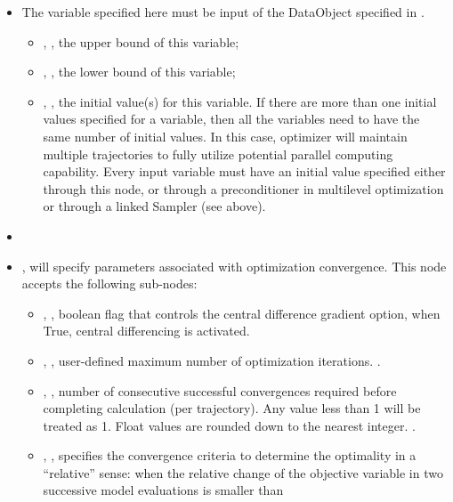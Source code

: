 \begin{itemize}
\item \variableDescription
 The variable specified here must be input of the DataObject specified in .
 \variableChildrenIntro
 \begin{itemize}
    \item {}, , the upper bound of this variable;
    \item {}, , the lower bound of this variable;
    \item {}, , the initial value(s) for this variable. If there are more
    than one initial values specified for a variable, then all the variables need to have the same number of initial values. In this case,
     optimizer will maintain multiple trajectories to fully utilize potential parallel computing capability.
    Every input variable must have an initial value specified either through this node, or through a
    preconditioner in multilevel optimization or through a linked Sampler (see above).
  \end{itemize}
\item \constantVariablesDescription
\item {},  will specify parameters associated with optimization
convergence. This node accepts the following sub-nodes:
  \begin{itemize}
  \item {}, ,  boolean
flag that controls the central difference gradient option, when True, central differencing is activated.  
  \item {}, , user-defined maximum number of optimization iterations. .
  \item {}, , number of consecutive successful
    convergences required before completing calculation (per trajectory). Any value less than 1 will be
    treated as 1.  Float values are rounded down to the nearest integer. .
  \item {}, , specifies the convergence criteria to determine the optimality
  in a ``relative'' sense: when the relative change of the objective variable in two successive model evaluations is smaller than

\end{itemize}
\end{itemize}
